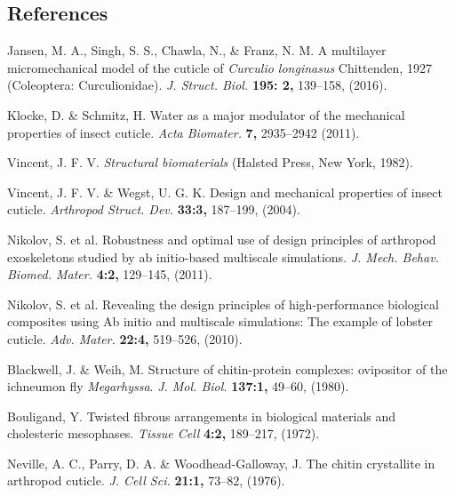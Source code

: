 \documentclass[twocolumn, linenumbers, superscriptaddress, nofootinbib]{revtex4-1}
\begin{document}
	\begin{thebibliography}{50}
		\section*{References}
				Jansen, M. A., Singh, S. S., Chawla, N., \& Franz, N. M.
				A multilayer micromechanical model of the cuticle of \textit{Curculio longinasus} Chittenden, 1927 (Coleoptera: Curculionidae).
				\textit{J. Struct. Biol.}
				\textbf{195: 2,}
				139--158,
				(2016).
				
				Klocke, D. \& Schmitz, H.
				Water as a major modulator of the mechanical properties of insect cuticle.
				\textit{Acta Biomater.}
				\textbf{7,}
				2935--2942
				(2011).
				
				Vincent, J. F. V.
				\textit{Structural biomaterials}
				(Halsted Press,
				New York,
				1982).
				
				Vincent, J. F. V. \& Wegst, U. G. K.
				Design and mechanical properties of insect cuticle.				
				\textit{Arthropod Struct. Dev.}
				\textbf{33:3,}
				187--199,
				(2004).
				
				Nikolov, S. et al.
				Robustness and optimal use of design principles of arthropod exoskeletons studied by ab initio-based multiscale simulations.
				\textit{J. Mech. Behav. Biomed. Mater.}
				\textbf{4:2,}
				129--145,
				(2011).
				
				Nikolov, S. et al.
				Revealing the design principles of high-performance biological composites using Ab initio and multiscale simulations: The example of lobster cuticle.
				\textit{Adv. Mater.}
				\textbf{22:4,}
				519--526,
				(2010).
				
				Blackwell, J. \& Weih, M.
				Structure of chitin-protein complexes: ovipositor of the ichneumon fly \textit{Megarhyssa}.
				\textit{J. Mol. Biol.}
				\textbf{137:1,}
				49--60,
				(1980).

				Bouligand, Y.
				Twisted fibrous arrangements in biological materials and cholesteric mesophases.
				\textit{Tissue Cell}
				\textbf{4:2,}
				189--217,
				(1972).
				
				Neville, A. C., Parry, D. A. \& Woodhead-Galloway, J.
				The chitin crystallite in arthropod cuticle.
				\textit{J. Cell Sci.}
				\textbf{21:1,}
				73--82,
				(1976).
				

\end{thebibliography}
\end{document}
